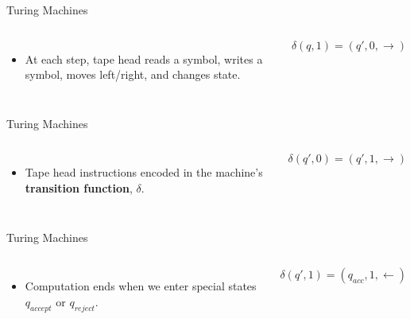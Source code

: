 \documentclass[c]{beamer}
\begin{document}
\begin{frame}{Turing Machines}
  \begin{columns}

    \begin{itemize}
    \item At each step, tape head reads a symbol, writes a symbol,
      moves left/right, and changes state.
    \end{itemize}
    
    $$\delta(q, 1) = (q', 0, \rightarrow)$$
  \end{columns}
\end{frame}

\begin{frame}{Turing Machines}
  \begin{columns}

    \begin{itemize}
    \item Tape head instructions encoded in the machine's
      \textbf{transition function}, $\delta$.
    \end{itemize}
    $$\delta(q', 0) = (q', 1, \rightarrow)$$
  \end{columns}
\end{frame}

\begin{frame}{Turing Machines}
  \begin{columns}

    \begin{itemize}
    \item Computation ends when we enter special states $q_{accept}$
      or $q_{reject}$.
    \end{itemize}
    $$\delta(q', 1) = (q_{acc}, 1, \leftarrow)$$
  \end{columns}
\end{frame}
\end{document}
